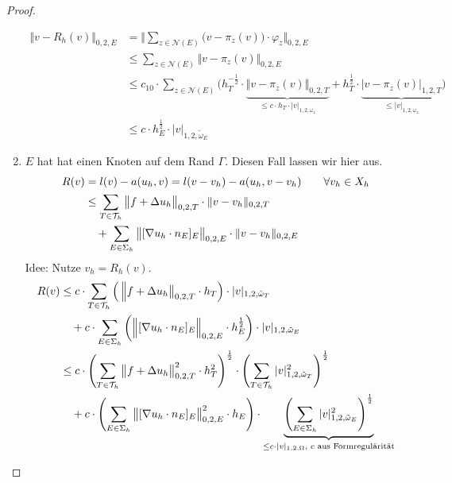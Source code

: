 \begin{proof}
\begin{enumerate}[label=\roman*)]
\begin{align*}
			\big\Vert v-R_h(v)\big\Vert_{0,2,E}
			&=\Bigg\Vert\sum\limits_{z\in\mathcal{N}(E)}\big(v-\pi_z(v)\big)\cdot\varphi_z\Bigg\Vert_{0,2,E}\\
			&\leq
			\sum\limits_{z\in\mathcal{N}(E)}\big\Vert v-\pi_z(v)\big\Vert_{0,2,E}\\
			&\leq
			c_{10}\cdot\sum\limits_{z\in\mathcal{N}(E)}\Big(h_T^{-\frac{1}{2}}\cdot\underbrace{\big\Vert v-\pi_z(v)\big\Vert_{0,2,T}}_{\leq c\cdot h_T\cdot|v|_{1,2,\omega_z}}+h_T^{\frac{1}{2}}\cdot\underbrace{\big|v-\pi_z(v)\big|_{1,2,T}}_{\leq|v|_{1,2,\omega_z}}\Big)\\
			&\leq
			c\cdot h_E^{\frac{1}{2}}\cdot|v|_{1,2,\tilde{\omega}_E}
		\end{align*}
		\item $E$ hat hat einen Knoten auf dem Rand $Γ$. %
			Diesen Fall lassen wir hier aus.
		\begin{align*}
			R(v)&=l(v)-a(u_h,v)=l(v-v_h)-a(u_h,v-v_h)\qquad\forall v_h\in X_h\\
			&\leq\sum\limits_{T\in\mathcal{T}_h}\big\Vert f+\Delta u_h\big\Vert_{0,2,T}\cdot\Vert v-v_h\Vert_{0,2,T}\\
			&{}\quad+\sum\limits_{E\in\Sigma_h}\big\Vert[\nabla u_h\cdot n_E]_E\big\Vert_{0,2,E}\cdot\Vert v-v_h\Vert_{0,2,E}
		\end{align*}
		Idee: Nutze $v_h=R_h(v)$.
		\begin{align*}
			R(v)&\leq
			c\cdot\sum\limits_{T\in\T_h}\Big(\left\Vert f+ \Delta u_h\big\Vert_{0,2,T}\cdot h_T\right)\cdot |v|_{1,2,\tilde{\omega}_T}\\
			&\quad+c\cdot\sum\limits_{E\in\Sigma_h}\left(\Big\Vert[\nabla u_h\cdot n_E]_E\Big\Vert_{0,2,E}\cdot h_E^{\frac{1}{2}}\right)\cdot|v|_{1,2,\tilde{\omega}_E}\\
			&\leq
			c\cdot\left(\sum\limits_{T\in\T_h}\big\Vert f+\Delta u_h\big\Vert^2_{0,2,T}\cdot h_T^2\right)^{\frac{1}{2}}\cdot\left(\sum\limits_{T\in\T_h}|v|^2_{1,2,\tilde{\omega}_T}\right)^{\frac{1}{2}}\\
			&\quad+c\cdot\left(\sum\limits_{E\in\Sigma_h}\big\Vert[\nabla u_h\cdot n_E]_E\big\Vert^2_{0,2,E}\cdot h_E\right)\cdot\underbrace{\left(\sum\limits_{E\in\Sigma_h}|v|^2_{1,2,\tilde{\omega}_E}\right)^{\frac{1}{2}}}_{\leq c\cdot |v|_{1,2,\Omega}\text{, $c$ aus Formregulärität}}\\

\end{align*}
\end{enumerate}
\end{proof}
